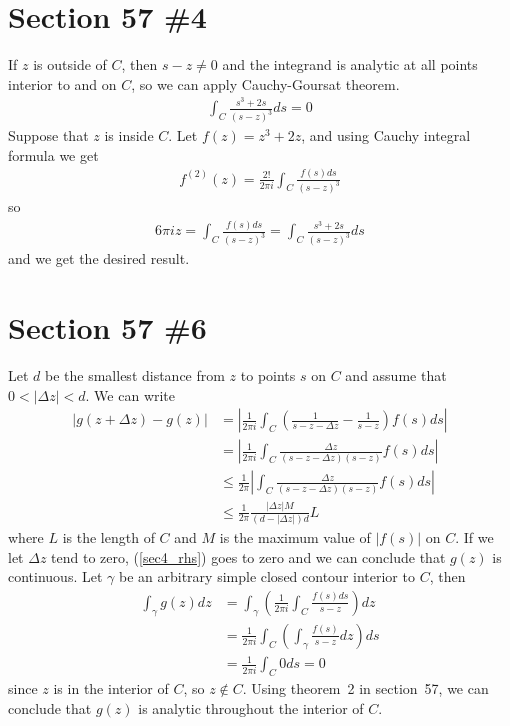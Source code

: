 \documentclass{scrartcl}
\begin{document}
\section{Section 57 \#4}
If \(z\) is outside of \(C\), then \(s - z \not = 0\) and the integrand is analytic at all points interior to and on \(C\), so we can apply Cauchy-Goursat theorem.
\begin{align*}
  \int_C \frac{s^3 + 2s}{(s - z)^3} ds = 0
\end{align*}
Suppose that \(z\) is inside \(C\).
Let \(f(z) = z^3 + 2z\), and using Cauchy integral formula we get
\begin{align*}
  f^{(2)}(z) = \frac{2!}{2\pi i} \int_C \frac{f(s) ds}{(s - z)^3}
\end{align*}
so
\begin{align*}
  6\pi iz = \int_C \frac{f(s) ds}{(s - z)^3} = \int_C \frac{s^3 + 2s}{(s - z)^3} ds
\end{align*}
and we get the desired result.

\section{Section 57 \#6}
Let \(d\) be the smallest distance from \(z\) to points \(s\) on \(C\) and assume that \(0 < |\Delta z| < d\).
We can write
\begin{align}
  \nonumber |g(z + \Delta z) - g(z)| &= \left| \frac{1}{2\pi i} \int_C \left( \frac{1}{s - z - \Delta z} - \frac{1}{s - z} \right) f(s) ds \right| \\
  \nonumber                          &= \left| \frac{1}{2\pi i} \int_C \frac{\Delta z}{(s - z - \Delta z)(s - z)} f(s) ds \right| \\
  \nonumber                          &\leq \frac{1}{2\pi} \left| \int_C \frac{\Delta z}{(s - z - \Delta z)(s - z)} f(s) ds \right| \\
  \label{sec4_rhs}                   &\leq \frac{1}{2\pi} \frac{|\Delta z|M}{(d - |\Delta z|)d} L
\end{align}
where \(L\) is the length of \(C\) and \(M\) is the maximum value of \(|f(s)|\) on \(C\).
If we let \(\Delta z\) tend to zero, (\ref{sec4_rhs}) goes to zero and we can conclude that \(g(z)\) is continuous.
Let \(\gamma\) be an arbitrary simple closed contour interior to \(C\), then
\begin{align*}
  \int_\gamma g(z) dz &= \int_\gamma \left( \frac{1}{2\pi i} \int_C \frac{f(s) ds}{s - z} \right) dz \\
                      &= \frac{1}{2\pi i} \int_C \left( \int_\gamma \frac{f(s)}{s - z} dz \right) ds \\
                      &= \frac{1}{2\pi i} \int_C 0 ds = 0
\end{align*}
since \(z\) is in the interior of \(C\), so \(z \not \in C\).
Using theorem~2 in section~57, we can conclude that \(g(z)\) is analytic throughout the interior of \(C\).
\end{document}

